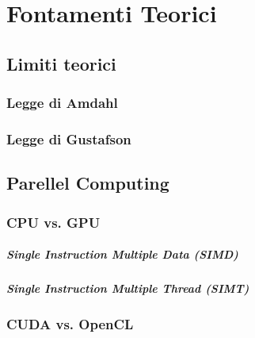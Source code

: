 \chapter{Fontamenti Teorici}
\label{ch:fondamenti}

\section{Limiti teorici}
\label{sec:limititeorici}

\lipsum[1]

\subsection{Legge di Amdahl}
\label{sec:amdahl}

\lipsum[1]

\subsection{Legge di Gustafson}
\label{sec:gustafson}

\lipsum[1]

\section{Parellel Computing}
\label{sec:cpuvsgpu}

\subsection{CPU vs. GPU}
\label{subsec:cpuvsgpu}

\paragraph{Single Instruction Multiple Data (SIMD)}
\label{para:simd}

\paragraph{Single Instruction Multiple Thread (SIMT)}
\label{para:simt}

\lipsum[1]

\subsection{CUDA vs. OpenCL}
\label{subsec:cudavsopencl}

\lipsum[1]